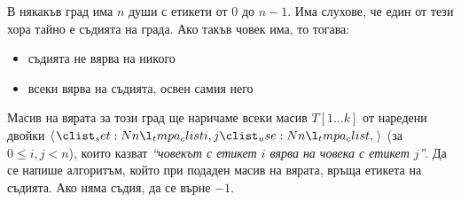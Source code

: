 \begin{problem}
В някакъв град има $n$ души с етикети от $0$ до $n - 1$.
Има слухове, че един от тези хора тайно е съдията на града.
Ако такъв човек има, то тогава:
\begin{itemize}
    \item съдията не вярва на никого
    \item всеки вярва на съдията, освен самия него
\end{itemize}
Масив на вярата за този град ще наричаме всеки масив $T[1 \dots k]$ от наредени двойки $\opair{i, j}$ (за $0 \leq i, j < n$), които казват \textit{``човекът с етикет $i$ вярва на човека с етикет $j$''}.
Да се напише алгоритъм, който при подаден масив на вярата, връща етикета на съдията.
Ако няма съдия, да се върне $-1$.
\end{problem}